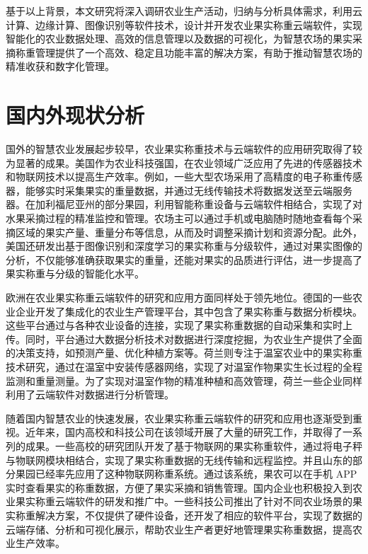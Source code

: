 基于以上背景，本文研究将深入调研农业生产活动，归纳与分析具体需求，利用云计算、边缘计算、图像识别等软件技术，设计并开发农业果实称重云端软件，实现智能化的农业数据处理、高效的信息管理以及数据的可视化，为智慧农场的果实采摘称重管理提供了一个高效、稳定且功能丰富的解决方案，有助于推动智慧农场的精准收获和数字化管理。 

\section{国内外现状分析}

国外的智慧农业发展起步较早，农业果实称重技术与云端软件的应用研究取得了较为显著的成果。美国作为农业科技强国，在农业领域广泛应用了先进的传感器技术和物联网技术以提高生产效率\cite{赵春江2021智慧农业的发展现状与未来展望}。例如，一些大型农场采用了高精度的电子称重传感器，能够实时采集果实的重量数据，并通过无线传输技术将数据发送至云端服务器\cite{陈学庚2020农业机械与信息技术融合发展现状与方向}。在加利福尼亚州的部分果园，利用智能称重设备与云端软件相结合，实现了对水果采摘过程的精准监控和管理\cite{Ampatzidis2011}。农场主可以通过手机或电脑随时随地查看每个采摘区域的果实产量、重量分布等信息，从而及时调整采摘计划和资源分配。此外，美国还研发出基于图像识别和深度学习的果实称重与分级软件，通过对果实图像的分析\cite{Anisha2019FruitRU}，不仅能够准确获取果实的重量，还能对果实的品质进行评估，进一步提高了果实称重与分级的智能化水平。

欧洲在农业果实称重云端软件的研究和应用方面同样处于领先地位。德国的一些农业企业开发了集成化的农业生产管理平台，其中包含了果实称重与数据分析模块\cite{Yin2020}。这些平台通过与各种农业设备的连接，实现了果实称重数据的自动采集和实时上传。同时，平台通过大数据分析技术对数据进行深度挖掘，为农业生产提供了全面的决策支持，如预测产量、优化种植方案等\cite{Phate2021}。荷兰则专注于温室农业中的果实称重技术研究，通过在温室中安装传感器网络，实现了对温室作物果实生长过程的全程监测和重量测量\cite{Graaf2004}。为了实现对温室作物的精准种植和高效管理，荷兰一些企业同样利用了云端软件对数据进行分析管理。

随着国内智慧农业的快速发展，农业果实称重云端软件的研究和应用也逐渐受到重视。近年来，国内高校和科技公司在该领域开展了大量的研究工作，并取得了一系列的成果。一些高校的研究团队开发了基于物联网的果实称重软件，通过将电子秤与物联网模块相结合，实现了果实称重数据的无线传输和远程监控\cite{Zhu2013}。并且山东的部分果园已经率先应用了这种物联网称重系统。通过该系统，果农可以在手机 APP 实时查看果实的称重数据，方便了果实采摘和销售管理\cite{Gao2023}。国内企业也积极投入到农业果实称重云端软件的研发和推广中。一些科技公司推出了针对不同农业场景的果实称重解决方案\cite{Ningbo2019}，不仅提供了硬件设备，还开发了相应的软件平台，实现了数据的云端存储、分析和可视化展示，帮助农业生产者更好地管理果实称重数据，提高农业生产效率。

